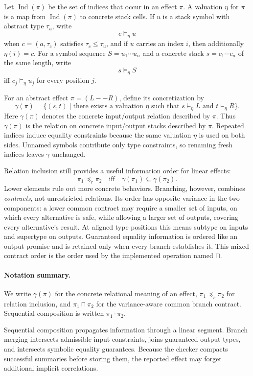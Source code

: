 \documentclass[acmsmall,screen,review,anonymous,nonacm]{acmart}
\newcommand{\glb}{\mathbin{\sqcap}}
\newcommand{\compose}{\mathbin{\cdot}}
\begin{document}
Let $\operatorname{Ind}(\pi)$ be the set of indices that occur in an effect $\pi$. A valuation $\eta$ for $\pi$ is a map from $\operatorname{Ind}(\pi)$ to concrete stack cells. If $u$ is a stack symbol with abstract type $\tau_u$, write
\[
c \models_\eta u
\]
when $c=(a,\tau_c)$ satisfies $\tau_c \leq \tau_u$, and if $u$ carries an index $i$, then additionally $\eta(i)=c$. For a symbol sequence $S=u_1\cdots u_n$ and a concrete stack $s=c_1\cdots c_n$ of the same length, write
\[
s \models_\eta S
\]
iff $c_j \models_\eta u_j$ for every position $j$.

For an abstract effect $\pi=(L -- R)$, define its concretization by
\[
\gamma(\pi)=\{(s,t) \mid \text{there exists a valuation } \eta
\text{ such that } s \models_\eta L \text{ and } t \models_\eta R\}.
\]
Here $\gamma(\pi)$ denotes the concrete input/output relation described by $\pi$.
Thus $\gamma(\pi)$ is the relation on concrete input/output stacks described by $\pi$. Repeated indices induce equality constraints because the same valuation $\eta$ is used on both sides. Unnamed symbols contribute only type constraints, so renaming fresh indices leaves $\gamma$ unchanged.

Relation inclusion still provides a useful information order for linear effects:
\[
\pi_1 \preceq_r \pi_2
\quad\text{iff}\quad
\gamma(\pi_1) \subseteq \gamma(\pi_2).
\]
Lower elements rule out more concrete behaviors. Branching, however, combines
\emph{contracts}, not unrestricted relations. Its order has opposite variance in the two
components: a lower common contract may require a smaller set of inputs, on which every
alternative is safe, while allowing a larger set of outputs, covering every alternative's
result. At aligned type positions this means subtype on inputs and supertype on outputs.
Guaranteed equality information is ordered like an output promise and is retained only
when every branch establishes it. This mixed contract order is the order used by the
implemented operation named $\glb$.

\paragraph{Notation summary.}
We write $\gamma(\pi)$ for the concrete relational meaning of an effect,
$\pi_1 \preceq_r \pi_2$ for relation inclusion, and $\pi_1 \glb \pi_2$ for the
variance-aware common branch contract. Sequential composition is written
$\pi_1 \compose \pi_2$.

Sequential composition propagates information through a linear segment. Branch merging
intersects admissible input constraints, joins guaranteed output types, and intersects
symbolic equality guarantees. Because the checker compacts successful summaries before
storing them, the reported effect may forget additional implicit correlations.
\end{document}
